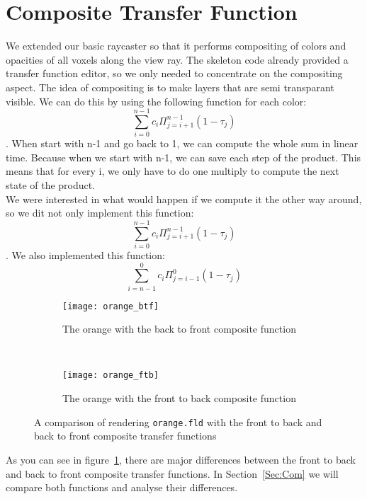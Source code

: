 \section{Composite Transfer Function}\label{Sec:Ctf}
We extended our basic raycaster so that it performs compositing of colors and opacities of all voxels along the view ray.
The skeleton code already provided a transfer function editor, so we only needed to concentrate on the compositing aspect.
The idea of compositing is to make layers that are semi transparant visible. 
We can do this by using the following function for each color: 
$$\sum_{i=0}^{n-1} c_{i}\Pi_{j=i+1}^{n-1}(1-\tau_{j})  $$.
When start with n-1 and go back to 1, we can compute the whole sum in linear time. 
Because when we start with n-1, we can save each step of the product.
This means that for every i, we only have to do one multiply to compute the next state of the product.\\
We were interested in what would happen if we compute it the other way around, so we dit not only implement this function: \\
$$\sum_{i=0}^{n-1} c_{i}\Pi_{j=i+1}^{n-1}(1-\tau_{j})  $$. 
We also implemented this function: \\
$$\sum_{i=n-1}^{0} c_{i}\Pi_{j=i-1}^{0}(1-\tau_{j})  $$
\begin{figure}[H]
	\centering
	\begin{subfigure}[t]{0.45\textwidth}
		\texttt{[image: orange\_btf]}
		\caption{The orange with the back to front composite function}
	\end{subfigure}
	~%
	\begin{subfigure}[t]{0.45\textwidth}
		\texttt{[image: orange\_ftb]}
		\caption{The orange with the front to back composite function}
	\end{subfigure}
	
	\caption{A comparison of rendering \texttt{orange.fld} with the front to back and back to front composite transfer functions}
	\label{fig:ctf:comp}
\end{figure}
As you can see in figure~\ref{fig:ctf:comp}, there are major differences between the front to back and back to front composite transfer functions.
In Section~\ref{Sec:Com} we will compare both functions and analyse their differences.




